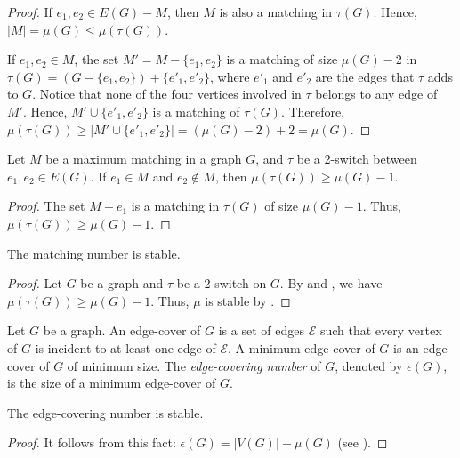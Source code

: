 \documentclass{BICA}
\begin{document}
\begin{proof}
If $e_{1},e_{2}\in E(G)-M$, then $M$ is also a matching in $\tau (G)$.  Hence, $|M|=\mu(G)\leq \mu(\tau (G))$.

If $e_{1},e_{2}\in M$, the set $M'=M-\{e_{1},e_{2}\}$ is a matching of size $\mu(G)-2$ in $\tau (G)=(G-\{e_{1},e_{2}\}) + \{e'_{1},e'_{2}\}$, where \(e'_{1}\) and \(e'_{2}\) are the edges that \(\tau\)  adds to \(G\). Notice that none of the four vertices involved in $\tau$ belongs to any edge of $M'$. Hence, \(M'\cup \{e'_{1},e'_{2}\}\) is a matching of \(\tau (G)\).  Therefore, $\mu(\tau(G))\geq |M'\cup \{e'_{1},e'_{2}\}|=(\mu(G)-2)+2=\mu(G)$.
\end{proof}

\begin{lemma}
	\label{matchlem2}
	 Let $M$ be a maximum matching in a graph $G$, and $\tau$ be a 2-switch between $e_{1},e_{2}\in E(G)$. If $e_{1}\in M$ and $e_{2}\notin M$, then $\mu(\tau(G))\geq\mu(G)-1$.
\end{lemma}

\begin{proof}
The set $M-e_{1}$ is a matching in $\tau(G)$ of size $\mu(G)-1$. Thus, $\mu(\tau(G))\geq \mu(G)-1$.
\end{proof}

\begin{theorem}
	\label{matching_stable}
	The matching number is stable.
\end{theorem}

\begin{proof}
Let $G$ be a graph and $\tau$ be a 2-switch on $G$. By  and , we have $\mu(\tau(G))\geq \mu(G)-1$. Thus, $\mu$ is stable by .
\end{proof}

Let $G$ be a graph. An edge-cover of $G$ is a set of edges $\mathcal{E}$ such that every vertex of $G$ is incident to at least one edge of $\mathcal{E}$. A minimum edge-cover of $G$ is an edge-cover of $G$ of minimum size. The \emph{edge-covering number} of $G$, denoted by $\epsilon(G)$, is the size of a minimum edge-cover of $G$.

\begin{corollary}
	\label{edgecover_stable}
	The edge-covering number is stable.
\end{corollary}

\begin{proof}
	It follows from this fact: $\epsilon(G)=|V(G)|-\mu(G)$ (see \cite{Gallai}).
\end{proof}
\end{document}
